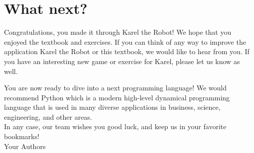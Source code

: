 \section{What next?}

Congratulations, you made it through Karel the Robot! We hope that you 
enjoyed the textbook and exercises. If you can think of any way to 
improve the application Karel the Robot or this textbook, we would like
to hear from you. If you have an interesting new game or exercise for 
Karel, please let us know as well. 

You are now ready to dive into a next programming language! We would 
recommend Python which is a modern high-level dynamical programming 
language that is used in many diverse applications in business, science,
engineering, and other areas.\\

\noindent
In any case, our team wishes you good luck, and keep us in your 
favorite bookmarks! \\

\hbox{} \hfill{} Your Authors


